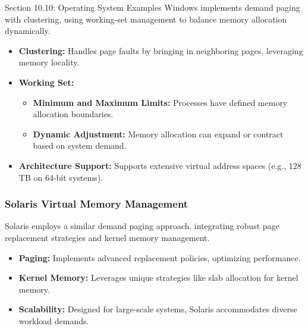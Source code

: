 \begin{notes}{Section 10.10: Operating System Examples}
    Windows implements demand paging with clustering, using working-set management to balance memory allocation dynamically.
    
    \begin{highlight}
    
    \begin{itemize}
        \item \textbf{Clustering:} Handles page faults by bringing in neighboring pages, leveraging memory locality.
        \item \textbf{Working Set:}
            \begin{itemize}
                \item \textbf{Minimum and Maximum Limits:} Processes have defined memory allocation boundaries.
                \item \textbf{Dynamic Adjustment:} Memory allocation can expand or contract based on system demand.
        \end{itemize}
        \item \textbf{Architecture Support:} Supports extensive virtual address spaces (e.g., 128 TB on 64-bit systems).
    \end{itemize}
    
    \end{highlight}
    
    \subsubsection*{Solaris Virtual Memory Management}
    
    Solaris employs a similar demand paging approach, integrating robust page replacement strategies and kernel memory management.
    
    \begin{highlight}
    
    \begin{itemize}
        \item \textbf{Paging:} Implements advanced replacement policies, optimizing performance.
        \item \textbf{Kernel Memory:} Leverages unique strategies like slab allocation for kernel memory.
        \item \textbf{Scalability:} Designed for large-scale systems, Solaris accommodates diverse workload demands.
    \end{itemize}
    
    \end{highlight}
    

\end{notes}
